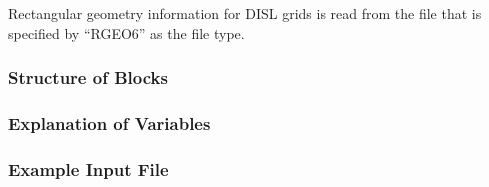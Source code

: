 Rectangular geometry information for DISL grids is read from the file that is specified by ``RGEO6'' as the file type.  

\vspace{5mm}
\subsubsection{Structure of Blocks}




\vspace{5mm}
\subsubsection{Explanation of Variables}
\begin{description}

\end{description}

\vspace{5mm}
\subsubsection{Example Input File}

